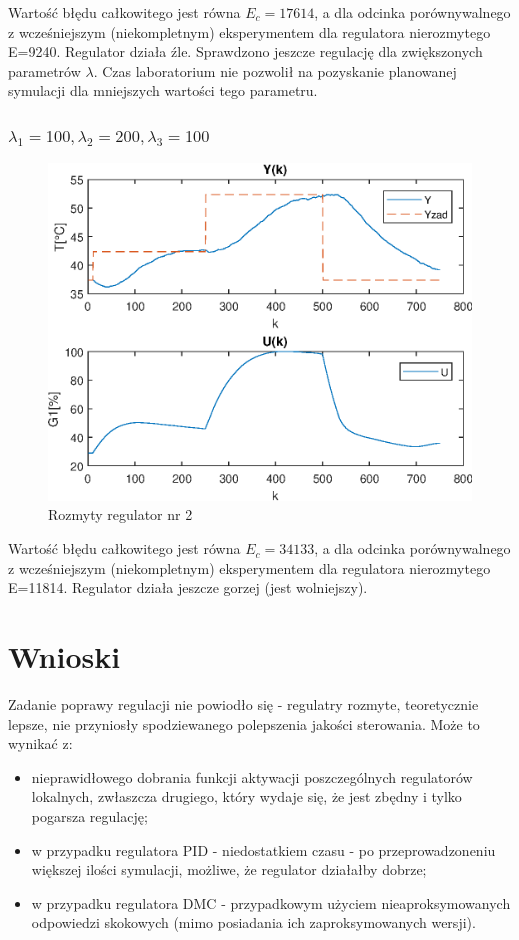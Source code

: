 Wartość błędu całkowitego jest równa $E_{c}=\num{17614}$, a dla odcinka porównywalnego z wcześniejszym (niekompletnym) eksperymentem dla regulatora nierozmytego E=\num{9240}. Regulator działa źle. Sprawdzono jeszcze regulację dla zwiększonych parametrów $\lambda$. Czas laboratorium nie pozwolił na pozyskanie planowanej symulacji dla mniejszych wartości tego parametru.
\FloatBarrier

\subsubsection{$\lambda_{1}=100, \lambda_{2}=200, \lambda_{3}=100$ }


\begin{figure}[h!]
	\centering
	\includegraphics[scale=1]{Rys/DMC2.eps}
	\caption{Rozmyty regulator nr 2}
	\label{dmc2}
\end{figure}


Wartość błędu całkowitego jest równa $E_{c}=\num{34133}$, a dla odcinka porównywalnego z wcześniejszym (niekompletnym) eksperymentem dla regulatora nierozmytego E=\num{11814}. Regulator działa jeszcze gorzej (jest wolniejszy).
\FloatBarrier

\section{Wnioski}

Zadanie poprawy regulacji nie powiodło się - regulatry rozmyte, teoretycznie lepsze, nie przyniosły spodziewanego polepszenia jakości sterowania. Może to wynikać z: 
\begin{itemize}
  \item nieprawidłowego dobrania funkcji aktywacji poszczególnych regulatorów lokalnych, zwłaszcza drugiego, który wydaje się, że jest zbędny i tylko pogarsza regulację;
  \item w przypadku regulatora PID - niedostatkiem czasu - po przeprowadzoneniu większej ilości symulacji, możliwe, że regulator działałby dobrze;
 \item w przypadku regulatora DMC - przypadkowym użyciem nieaproksymowanych odpowiedzi skokowych (mimo posiadania ich zaproksymowanych wersji).
\end{itemize}
